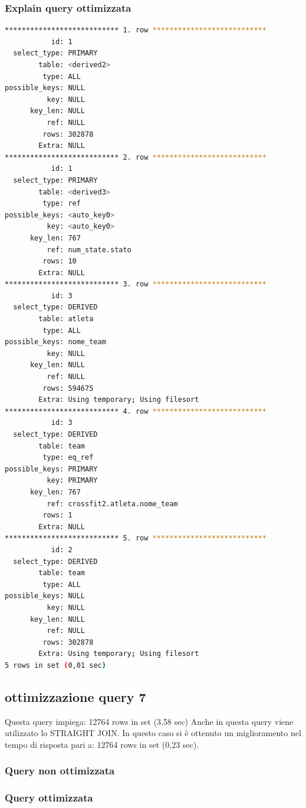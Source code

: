 \documentclass[12pt,a4paper]{article}
\begin{document}
\subsubsection{Explain query ottimizzata}
\begin{lstlisting}[language=Bash]
*************************** 1. row ***************************
           id: 1
  select_type: PRIMARY
        table: <derived2>
         type: ALL
possible_keys: NULL
          key: NULL
      key_len: NULL
          ref: NULL
         rows: 302878
        Extra: NULL
*************************** 2. row ***************************
           id: 1
  select_type: PRIMARY
        table: <derived3>
         type: ref
possible_keys: <auto_key0>
          key: <auto_key0>
      key_len: 767
          ref: num_state.stato
         rows: 10
        Extra: NULL
*************************** 3. row ***************************
           id: 3
  select_type: DERIVED
        table: atleta
         type: ALL
possible_keys: nome_team
          key: NULL
      key_len: NULL
          ref: NULL
         rows: 594675
        Extra: Using temporary; Using filesort
*************************** 4. row ***************************
           id: 3
  select_type: DERIVED
        table: team
         type: eq_ref
possible_keys: PRIMARY
          key: PRIMARY
      key_len: 767
          ref: crossfit2.atleta.nome_team
         rows: 1
        Extra: NULL
*************************** 5. row ***************************
           id: 2
  select_type: DERIVED
        table: team
         type: ALL
possible_keys: NULL
          key: NULL
      key_len: NULL
          ref: NULL
         rows: 302878
        Extra: Using temporary; Using filesort
5 rows in set (0,01 sec)
\end{lstlisting}
\subsection{ottimizzazione query 7}
Questa query impiega: 12764 rows in set (3,58 sec)
Anche in questa query viene utilizzato lo STRAIGHT JOIN. In questo caso si è ottenuto un miglioramento nel tempo di risposta pari a: 12764 rows in set (0,23 sec).
\subsubsection{Query non ottimizzata}

\subsubsection{Query ottimizzata}

\end{document}
